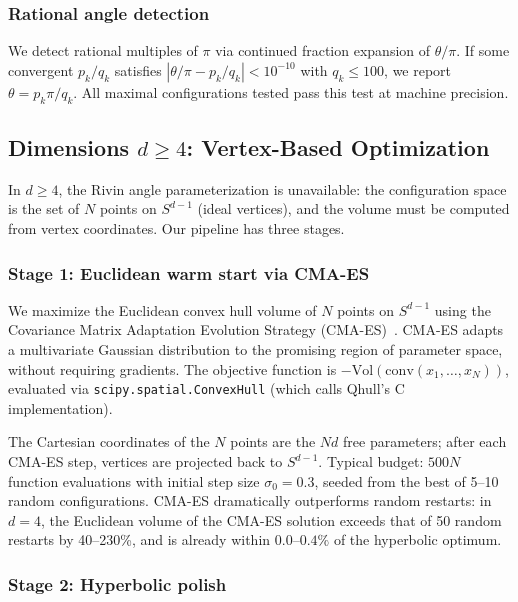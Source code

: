 \documentclass[11pt]{article}
\begin{document}
\subsubsection{Rational angle detection}

We detect rational multiples of $\pi$ via continued fraction
expansion of $\theta/\pi$.  If some convergent $p_k/q_k$
satisfies $|\theta/\pi - p_k/q_k| < 10^{-10}$ with $q_k \leq 100$,
we report $\theta = p_k\pi/q_k$.  All maximal configurations
tested pass this test at machine precision.

\subsection{Dimensions $d \geq 4$: Vertex-Based Optimization}

In $d \geq 4$, the Rivin angle parameterization is unavailable:
the configuration space is the set of $N$ points on $S^{d-1}$
(ideal vertices), and the volume must be computed from vertex
coordinates.  Our pipeline has three stages.

\subsubsection{Stage 1: Euclidean warm start via CMA-ES}

We maximize the Euclidean convex hull volume of $N$ points
on $S^{d-1}$ using the Covariance Matrix Adaptation Evolution
Strategy (CMA-ES)~\cite{HansenOstermeier2001}.  CMA-ES adapts a
multivariate Gaussian distribution to the promising region of
parameter space, without requiring gradients.  The objective
function is $-\mathrm{Vol}(\mathrm{conv}(x_1,\ldots,x_N))$,
evaluated via \texttt{scipy.spatial.ConvexHull} (which calls
Qhull's C implementation).

The Cartesian coordinates of the $N$ points are the $Nd$ free
parameters; after each CMA-ES step, vertices are projected back to
$S^{d-1}$.  Typical budget: $500N$ function evaluations with initial
step size $\sigma_0 = 0.3$, seeded from the best of 5--10 random
configurations.  CMA-ES dramatically outperforms random restarts:
in $d = 4$, the Euclidean volume of the CMA-ES solution exceeds
that of 50 random restarts by 40--230\%, and is already within
$0.0$--$0.4\%$ of the hyperbolic optimum.

\subsubsection{Stage 2: Hyperbolic polish}
\end{document}
